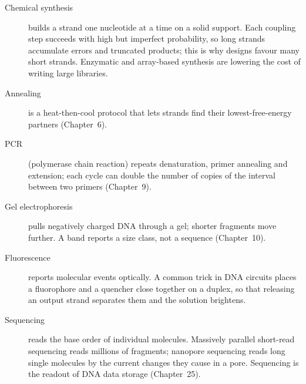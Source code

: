 \begin{description}
\item[Chemical synthesis] builds a strand one nucleotide at a time on a solid
support. Each coupling step succeeds with high but imperfect probability, so
long strands accumulate errors and truncated products; this is why designs
favour many short strands. Enzymatic and array-based synthesis are lowering the
cost of writing large libraries.\cite{Kosuri2014}
\item[Annealing] is a heat-then-cool protocol that lets strands find their
lowest-free-energy partners (Chapter~6).
\item[PCR] (polymerase chain reaction) repeats denaturation, primer annealing and
extension; each cycle can double the number of copies of the interval between
two primers (Chapter~9).\cite{Saiki1988}
\item[Gel electrophoresis] pulls negatively charged DNA through a gel; shorter
fragments move further. A band reports a size class, not a sequence
(Chapter~10).
\item[Fluorescence] reports molecular events optically. A common trick in DNA
circuits places a fluorophore and a quencher close together on a duplex, so
that releasing an output strand separates them and the solution brightens.
\item[Sequencing] reads the base order of individual molecules. Massively
parallel short-read sequencing reads millions of fragments; nanopore sequencing
reads long single molecules by the current changes they cause in a pore.
Sequencing is the readout of DNA data storage (Chapter~25).
\end{description}


